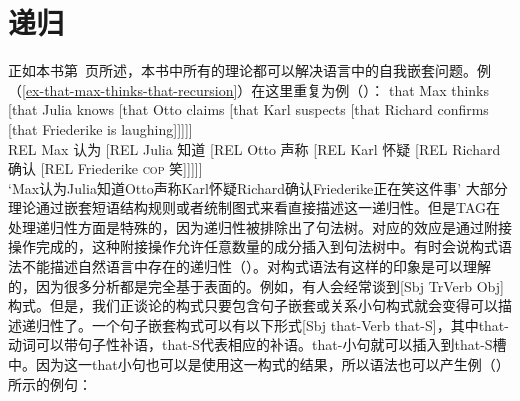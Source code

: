 \section{递归}
\label{sec-recursion}

正如本书第~\pageref{ex-that-max-thinks-that-recursion}页所述，本书中所有的理论都可以解决语言中的自我嵌套问题。例（\ref{ex-that-max-thinks-that-recursion}）在这里重复为例（）：
\ea
\label{ex-that-max-thinks-that-recursion-two}
\gll that Max thinks [that Julia knows [that Otto claims [that Karl suspects [that Richard confirms [that Friederike is laughing]]]]]\\
	REL Max 认为 [REL Julia 知道 [REL Otto 声称 [REL Karl 怀疑 [REL Richard 确认 [REL Friederike \textsc{cop} 笑]]]]]\\
\glt `Max认为Julia知道Otto声称Karl怀疑Richard确认Friederike正在笑这件事'
\z
大部分理论通过嵌套短语结构规则或者统制图式来看直接描述这一递归性。但是TAG\indextagc 在处理递归性方面是特殊的，因为递归性被排除出了句法树。对应的效应是通过附接操作完成的，这种附接操作允许任意数量的成分插入到句法树中。有时会说构式语法\indexcxgc 不能描述自然语言中存在的递归性（\egc \citealp[]{Leiss2009a}）。对构式语法有这样的印象是可以理解的，因为很多分析都是完全基于表面的。例如，有人会经常谈到[Sbj TrVerb Obj]构式。但是，我们正谈论的构式只要包含句子嵌套或关系小句构式就会变得可以描述递归性了。一个句子嵌套构式可以有以下形式[Sbj that-Verb that-S]，其中that-动词可以带句子性补语，that-S代表相应的补语。that-小句就可以插入到that-S槽中。因为这一that小句也可以是使用这一构式的结果，所以语法也可以产生例（）所示的例句：
